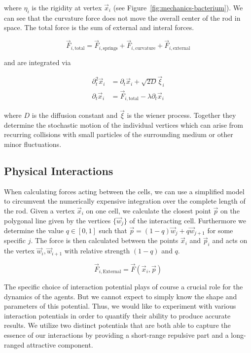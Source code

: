 \documentclass{article}
\begin{document}
where $\eta_i$ is the rigidity at vertex $\vec{x}_i$ (see Figure~\ref{fig:mechanics-bacterium}).
We can see that the curvature force does not move the overall center of the rod in space.
The total force is the sum of external and interal forces.

\begin{equation}
    \vec{F}_{i,\text{total}} = \vec{F}_{i,\text{springs}}+ \vec{F}_{i,\text{curvature}}
        + \vec{F}_{i,\text{external}}
\end{equation}

and are integrated via

\begin{align}
    \partial_t^2 \vec{x}_i &= \partial_t\vec{x}_i + \sqrt{2D}\vec{\xi}_i\\
    \partial_t\vec{x}_i &= \vec{F}_{i,\text{total}} - \lambda \partial_t\vec{x}_i
\end{align}

where $D$ is the diffusion constant and $\vec{\xi}$ is the wiener process.
Together they determine the stochastic motion of the individual vertices which can arise from
recurring collisions with small particles of the surrounding medium or other minor fluctuations.

\subsection{Physical Interactions}
\label{subsection:mechanical-model-interactions}

When calculating forces acting between the cells, we can use a simplified model to circumvent the
numerically expensive integration over the complete length of the rod.
Given a vertex $\vec{x}_i$ on one cell, we calculate the closest point $\vec{p}$ on the polygonal
line given by the vertices $\{\vec{w}_j\}$ of the interacting cell.
Furthermore we determine the value $q\in[0,1]$ such that $\vec{p} = (1-q)\vec{w}_j + q\vec{w}_{j+1}$
for some specific $j$.
The force is then calculated between the points $\vec{x}_i$ and $\vec{p}_i$ and acts on
the vertex $\vec{w}_i,\vec{w}_{i+1}$ with relative strength $(1-q)$ and $q$.

\begin{equation}
    \vec{F}_{i,\text{External}} = \vec{F}(\vec{x}_i,\vec{p})
    \label{eq:cell-force-external}
\end{equation}

The specific choice of interaction potential plays of course a crucial role for the dynamics of the
agents.
But we cannot expect to simply know the shape and parameters of this potential.
Thus, we would like to experiment with various interaction potentials in order to quantify their
ability to produce accurate results.
We utilize two distinct potentials that are both able to capture the essence of our interactions by
providing a short-range repulsive part and a long-ranged attractive component.
\end{document}
